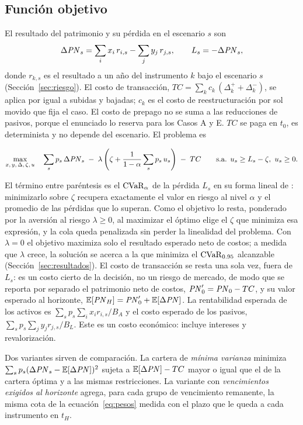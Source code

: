 \subsection{Función objetivo}
El resultado del patrimonio y su pérdida en el escenario $s$ son
\begin{equation}
  \Delta \mathit{PN}_s = \sum_{i} x_i\, r_{i,s} - \sum_{j} y_j\, r_{j,s}, \qquad L_s = -\Delta \mathit{PN}_s,
\end{equation}
donde $r_{k,s}$ es el resultado a un año del instrumento $k$ bajo el escenario $s$ (Sección~\ref{sec:riesgo}). El
costo de transacción, $TC = \sum_k c_k\,(\Delta_k^+ + \Delta_k^-)$, se aplica por igual a subidas y bajadas;
$c_k$ es el costo de reestructuración por sol movido que fija el caso. El costo de prepago no se suma a las
reducciones de pasivos, porque el enunciado lo reserva para los Casos A y E. $TC$ se paga en $t_0$, es determinista y no depende del escenario. El problema es

\begin{equation}
  \max_{x,\,y,\,\Delta,\,\zeta,\,u}\quad \sum_{s} p_s\,\Delta \mathit{PN}_s \;-\; \lambda\left(\zeta + \frac{1}{1-\alpha}\sum_s p_s\, u_s\right) \;-\; TC
  \qquad\text{s.a. } u_s \ge L_s - \zeta,\ u_s \ge 0.
  \label{eq:objetivo}
\end{equation}

El término entre paréntesis es el $\operatorname{CVaR}_\alpha$ de la pérdida $L_s$ en su forma lineal de
\textcite{rockafellar2000}: minimizarlo sobre $\zeta$ recupera exactamente el valor en riesgo al nivel
$\alpha$ y el promedio de las pérdidas que lo superan. Como el objetivo lo resta, ponderado por la
aversión al riesgo $\lambda \ge 0$, al maximizar el óptimo elige el $\zeta$ que minimiza esa expresión, y la
cola queda penalizada sin perder la linealidad del problema. Con $\lambda = 0$ el objetivo maximiza solo el resultado esperado neto de costos; a medida que
$\lambda$ crece, la solución se acerca a la que minimiza el $\operatorname{CVaR}_{0.95}$ alcanzable (Sección~\ref{sec:resultados}).
El costo de transacción se resta una sola vez, fuera de $L_s$: es un costo cierto de la decisión, no un
riesgo de mercado, de modo que se reporta por separado el patrimonio neto de costos, $\mathit{PN}_0' = \mathit{PN}_0 - TC$,
y su valor esperado al horizonte, $\mathbb{E}[\mathit{PN}_H] = \mathit{PN}_0' + \mathbb{E}[\Delta \mathit{PN}]$. La rentabilidad esperada de los
activos es $\sum_s p_s \sum_i x_i r_{i,s} / B_A$ y el costo esperado de los pasivos,
$\sum_s p_s \sum_j y_j r_{j,s} / B_L$. Este es un costo económico: incluye intereses y revalorización.

Dos variantes sirven de comparación. La cartera de \emph{mínima varianza} minimiza
$\sum_s p_s (\Delta \mathit{PN}_s - \mathbb{E}[\Delta \mathit{PN}])^2$ sujeta a $\mathbb{E}[\Delta \mathit{PN}] - TC$ mayor o igual que el de la
cartera óptima y a las mismas restricciones. La variante con \emph{vencimientos exigidos al horizonte}
agrega, para cada grupo de vencimiento remanente, la misma cota de la ecuación~\eqref{eq:pesos} medida con
el plazo que le queda a cada instrumento en $t_H$.

